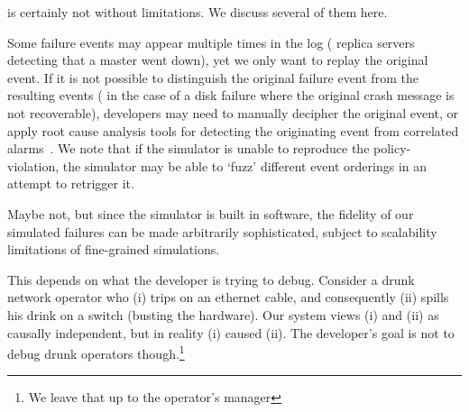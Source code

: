\Simulator{} is certainly not without limitations. We discuss several of them
here.

 Some failure events may appear
multiple times in the log (\eg{} replica servers detecting that a master went down),
yet we only want to replay the original event.
If it is not possible to distinguish the original
failure event from the resulting events (\eg{} in the case of a disk failure
where the original crash message is not recoverable), developers may need to
manually decipher the original event, or apply root cause analysis tools for
detecting the originating event from correlated alarms~\cite{577079}.
We note that if the simulator is unable to reproduce the policy-violation,
the simulator may be able to `fuzz' different event
orderings in an attempt to retrigger it.


Maybe not, but since the simulator
is built in software, the fidelity of our simulated failures
can be made arbitrarily sophisticated, subject to scalability
limitations of fine-grained simulations.

 This depends on what the developer is trying to debug.
Consider a drunk network operator who (i) trips on an ethernet cable, and
consequently (ii) spills his drink on a switch (busting the hardware). Our
system views (i) and (ii) as causally independent, but in reality (i) caused
(ii). The developer's goal is not to debug drunk operators though.\footnote{We
leave that up to the operator's manager}

